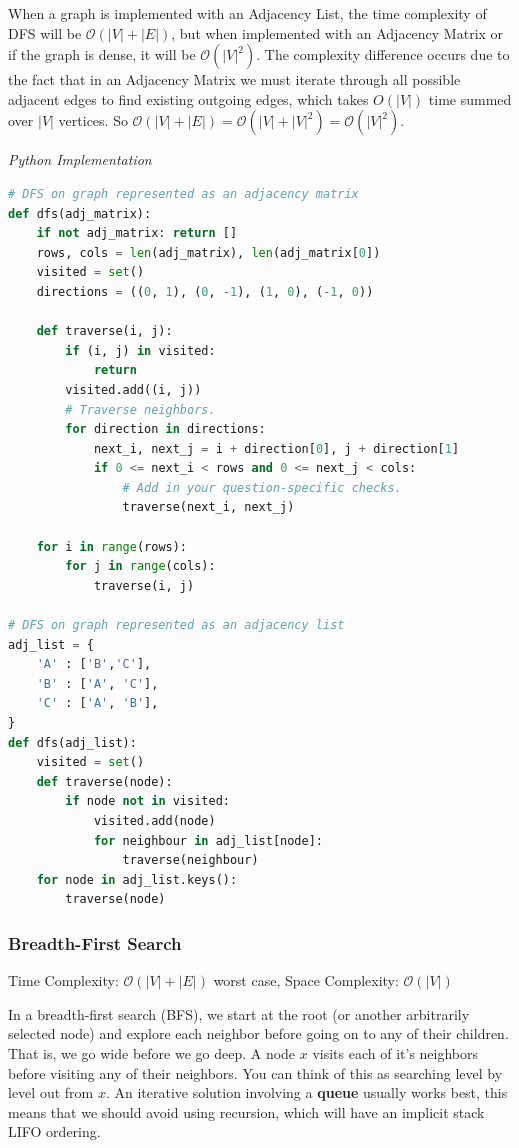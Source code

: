 \documentclass{article}
\newcommand{\bigO}{\mathcal{O}}
\begin{document}
    When a graph is implemented with an Adjacency List, the time complexity of DFS will be $\bigO(|V| + |E|)$, but when implemented with an Adjacency Matrix or if the graph is dense, it will be $\bigO(|V|^2)$. The complexity difference occurs due to the fact that in an Adjacency Matrix we must iterate through all possible adjacent edges to find existing outgoing edges, which takes $O(|V|)$ time summed over $|V|$ vertices. So $\bigO(|V| + |E|) = \bigO(|V| + |V|^2) = \bigO(|V|^2)$.
    
\vspace{8pt} \emph{Python Implementation}
\begin{lstlisting}[language=Python]
# DFS on graph represented as an adjacency matrix 
def dfs(adj_matrix):
    if not adj_matrix: return []
    rows, cols = len(adj_matrix), len(adj_matrix[0])
    visited = set()
    directions = ((0, 1), (0, -1), (1, 0), (-1, 0))

    def traverse(i, j):
        if (i, j) in visited:
            return
        visited.add((i, j))
        # Traverse neighbors.
        for direction in directions:
            next_i, next_j = i + direction[0], j + direction[1]
            if 0 <= next_i < rows and 0 <= next_j < cols:
                # Add in your question-specific checks.
                traverse(next_i, next_j)

    for i in range(rows):
        for j in range(cols):
            traverse(i, j)

# DFS on graph represented as an adjacency list
adj_list = {
    'A' : ['B','C'],
    'B' : ['A', 'C'],
    'C' : ['A', 'B'],
}
def dfs(adj_list):
    visited = set()
    def traverse(node):
        if node not in visited:
            visited.add(node)
            for neighbour in adj_list[node]:
                traverse(neighbour)
    for node in adj_list.keys():
        traverse(node)
\end{lstlisting}

    \subsubsection{Breadth-First Search}
    Time Complexity: $\bigO(|V| + |E|)$ worst case, Space Complexity: $\bigO(|V|)$
    
    In a breadth-first search (BFS), we start at the root (or another arbitrarily selected node) and explore each neighbor before going on to any of their children. That is, we go wide before we go deep. A node $x$ visits each of it's neighbors before visiting any of their neighbors. You can think of this as searching level by level out from $x$. An iterative solution involving a \textbf{queue} usually works best, this means that we should avoid using recursion, which will have an implicit stack LIFO ordering.
    
\end{document}
